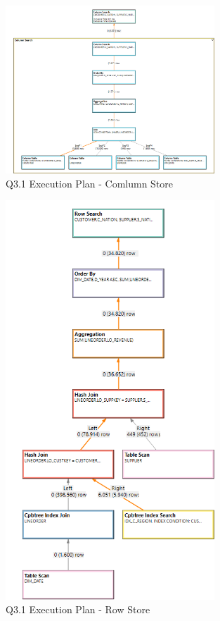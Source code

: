 \begin{figure}[H]
	\centering
	\includegraphics[width=0.7\textwidth]{images/q3-1-col-exec.png}
	\caption{Q3.1 Execution Plan - Comlumn Store}\label{auswertung:q3.1:col}
\end{figure}
\begin{figure}[H]
	\centering
	\includegraphics[width=0.7\textwidth]{images/q3-1-row-exec.png}
	\caption{Q3.1 Execution Plan - Row Store}\label{auswertung:q3.1:row}
\end{figure}
